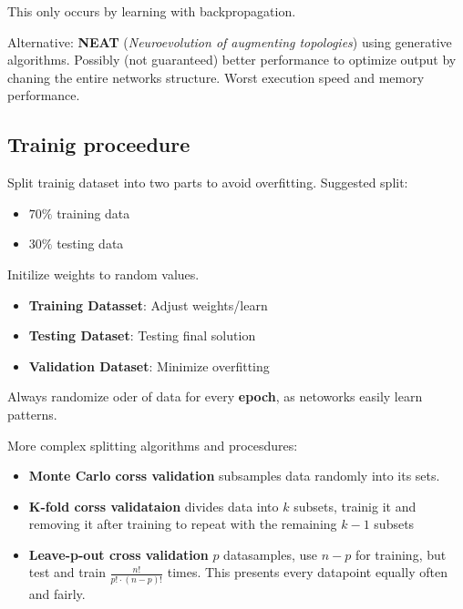 \documentclass[
    fontsize      = 11pt,
    paper         = a4,
    twoside       = false,
    parskip       = half,
    pagesize      = false,
]{scrartcl}
\providecommand{\tightlist}{%
  \setlength{\itemsep}{0pt}\setlength{\parskip}{0pt}}
\begin{document}
This only occurs by learning with backpropagation.

Alternative: \textbf{NEAT} (\emph{Neuroevolution of augmenting
topologies}) using generative algorithms. Possibly (not guaranteed)
better performance to optimize output by chaning the entire networks
structure. Worst execution speed and memory performance.

\hypertarget{trainig-proceedure}{%
\subsection{Trainig proceedure}\label{trainig-proceedure}}

Split trainig dataset into two parts to avoid overfitting. Suggested
split:

\begin{itemize}
\tightlist
\item
  \(70\%\) training data
\item
  \(30\%\) testing data
\end{itemize}

Initilize weights to random values.

\begin{itemize}
\tightlist
\item
  \textbf{Training Datasset}: Adjust weights/learn
\item
  \textbf{Testing Dataset}: Testing final solution
\item
  \textbf{Validation Dataset}: Minimize overfitting
\end{itemize}

Always randomize oder of data for every \textbf{epoch}, as netoworks
easily learn patterns.

More complex splitting algorithms and procesdures:

\begin{itemize}
\tightlist
\item
  \textbf{Monte Carlo corss validation} subsamples data randomly into
  its sets.
\item
  \textbf{K-fold corss validataion} divides data into \(k\) subsets,
  trainig it and removing it after training to repeat with the remaining
  \(k-1\) subsets
\item
  \textbf{Leave-p-out cross validation} \(p\) datasamples, use \(n-p\)
  for training, but test and train \(\frac{n!}{p!\cdot (n-p)!}\) times.
  This presents every datapoint equally often and fairly.
\end{itemize}
\end{document}
